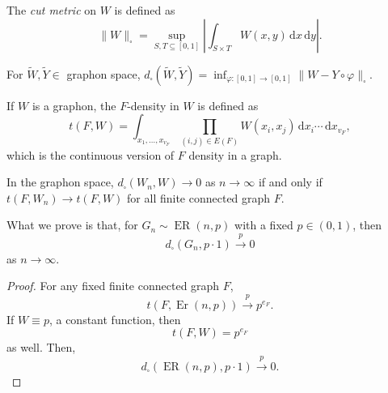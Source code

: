 \begin{definition}\label{def:cut-metric}
	The \emph{cut metric} on \(W\) is defined as
	\[
		\lVert W \rVert _{\square }
		= \sup _{S, T \subseteq [0, 1]} \left\lvert \int _{S \times T} W(x, y) \,\mathrm{d} x \,\mathrm{d} y \right\rvert .
	\]
\end{definition}

For \(\widetilde{W} , \widetilde{Y} \in \) graphon space, \(d_{\square}(\widetilde{W} , \widetilde{Y} ) = \inf _{\varphi \colon [0, 1] \to [0, 1]} \lVert W - Y \circ \varphi \rVert _{\square}\).

If \(W\) is a graphon, the \(F\)-density in \(W\) is defined as
\[
	t(F, W)
	= \int_{x_1, \dots , x_{v_F}} \prod_{(i, j) \in E(F)} W(x_i, x_j) \,\mathrm{d} x_i \cdots \,\mathrm{d} x_{v_F},
\]
which is the continuous version of \(F\) density in a graph.

\begin{theorem}
	In the graphon space, \(d_{\square}(W_n, W) \to 0\) as \(n \to \infty \) if and only if \(t(F, W_n) \to t(F, W)\) for all finite connected graph \(F\).
\end{theorem}

What we prove is that, for \(G_n \sim \operatorname{ER}(n, p) \) with a fixed \(p \in (0, 1)\), then
\[
	d_{\square} (G_n, p \cdot 1)
	\overset{p}{\to} 0
\]
as \(n \to \infty \).

\begin{proof}
	For any fixed finite connected graph \(F\),
	\[
		t(F, \operatorname{Er}(n, p) )
		\overset{p}{\to} p^{e_F}.
	\]
	If \(W \equiv p\), a constant function, then
	\[
		t(F, W) = p^{e_F}
	\]
	as well. Then,
	\[
		d_{\square}(\operatorname{ER}(n, p) , p \cdot 1)
		\overset{p}{\to} 0.
	\]
\end{proof}